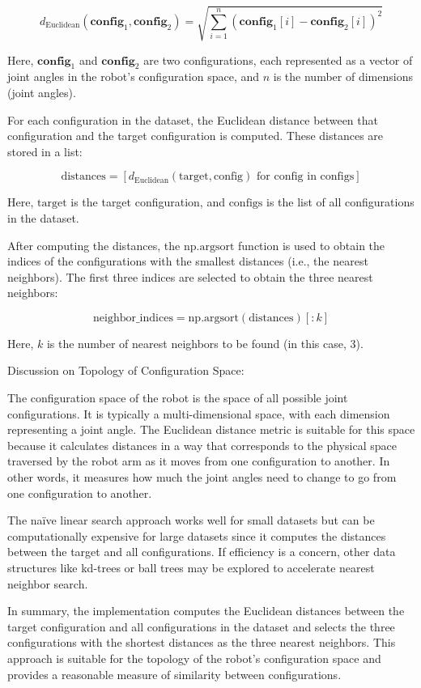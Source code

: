 \documentclass{article}
\begin{document}
\[
d_{\text{Euclidean}}(\mathbf{config}_1, \mathbf{config}_2) = \sqrt{\sum_{i=1}^{n} (\mathbf{config}_1[i] - \mathbf{config}_2[i])^2}
\]

Here, \(\mathbf{config}_1\) and \(\mathbf{config}_2\) are two configurations, each represented as a vector of joint angles in the robot's configuration space, and \(n\) is the number of dimensions (joint angles).

For each configuration in the dataset, the Euclidean distance between that configuration and the target configuration is computed. These distances are stored in a list:

\[
\text{distances} = [d_{\text{Euclidean}}(\text{target}, \text{config}) \text{ for config in configs}]
\]

Here, \(\text{target}\) is the target configuration, and \(\text{configs}\) is the list of all configurations in the dataset.

After computing the distances, the \(\text{np.argsort}\) function is used to obtain the indices of the configurations with the smallest distances (i.e., the nearest neighbors). The first three indices are selected to obtain the three nearest neighbors:

\[
\text{neighbor\_indices} = \text{np.argsort}(\text{distances})[:k]
\]

Here, \(k\) is the number of nearest neighbors to be found (in this case, 3).

Discussion on Topology of Configuration Space:

The configuration space of the robot is the space of all possible joint configurations. It is typically a multi-dimensional space, with each dimension representing a joint angle. The Euclidean distance metric is suitable for this space because it calculates distances in a way that corresponds to the physical space traversed by the robot arm as it moves from one configuration to another. In other words, it measures how much the joint angles need to change to go from one configuration to another.

The naïve linear search approach works well for small datasets but can be computationally expensive for large datasets since it computes the distances between the target and all configurations. If efficiency is a concern, other data structures like kd-trees or ball trees may be explored to accelerate nearest neighbor search.

In summary, the implementation computes the Euclidean distances between the target configuration and all configurations in the dataset and selects the three configurations with the shortest distances as the three nearest neighbors. This approach is suitable for the topology of the robot's configuration space and provides a reasonable measure of similarity between configurations.
\end{document}
